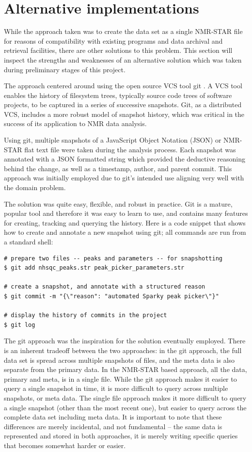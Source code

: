 \section{Alternative implementations}

While the approach taken was to create the data set as a single NMR-STAR
file for reasons of compatibility with existing programs and data archival
and retrieval facilities, there are other solutions to this problem.  This
section will inspect the strengths and weaknesses of an alternative solution
which was taken during preliminary stages of this project.

The approach centered around using the open source VCS tool git 
\cite{loeliger2012git}.  A VCS tool enables the history of filesystem trees,
typically source code trees of software projects, to be captured in a series
of successive snapshots.  Git, as a distributed VCS, includes a more robust
model of snapshot history, which was critical in the success of its 
application to NMR data analysis.

Using git, multiple snapshots of a JavaScript Object Notation (JSON) or 
NMR-STAR flat text file were
taken during the analysis process.  Each snapshot was annotated with a 
JSON formatted string which provided the deductive reasoning behind the change,
as well as a timestamp, author, and parent commit.  This approach was initially
employed due to git's intended use aligning very well with the domain problem.

The solution was quite easy, flexible, and robust in practice.  Git is a mature,
popular tool and therefore it was easy to learn to use, and contains many
features for creating, tracking and querying the history.  Here is a code 
snippet that shows how to create and annotate a new snapshot using git; all
commands are run from a standard shell:
\begin{verbatim}
# prepare two files -- peaks and parameters -- for snapshotting
$ git add nhsqc_peaks.str peak_picker_parameters.str

# create a snapshot, and annotate with a structured reason
$ git commit -m "{\"reason": "automated Sparky peak picker\"}"

# display the history of commits in the project
$ git log
\end{verbatim}

The git approach was the inspiration for the solution eventually employed.
There is an inherent tradeoff between the two approaches: in the git approach,
the full data set is spread across multiple snapshots of files, and the meta
data is also separate from the primary data.  In the NMR-STAR based approach,
all the data, primary and meta, is in a single file.  While the git approach
makes it easier to query a single snapshot in time, it is more difficult to
query across multiple snapshots, or meta data.  The single file approach makes
it more difficult to query a single snapshot (other than the most recent one),
but easier to query across the complete data set including meta data.  It is
important to note that these differences are merely incidental, and not 
fundamental -- the same data is represented and stored in both approaches, it
is merely writing specific queries that becomes somewhat harder or easier.

